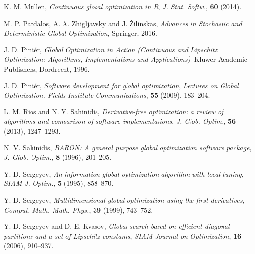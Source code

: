 \documentclass[runningheads]{llncs}
\begin{document}
\begin{thebibliography}{107}
\newblock K. M. Mullen,
\newblock \emph{\emph{Continuous global optimization in R}},
\newblock \emph{J. Stat. Softw.}, \textbf{60} (2014).

\newblock M. P. Pardalos, A. A. Zhigljavsky and J. \v Zilinskas,
\newblock \emph{Advances in Stochastic and Deterministic Global Optimization},
\newblock Springer, 2016.

\newblock J. D. Pint\'er,
\newblock \emph{Global Optimization in Action (Continuous and Lipschitz Optimization: Algorithms, Implementations and Applications)},
\newblock Kluwer Academic Publishers, Dordrecht, 1996.

\newblock J. D. Pint\'er,
\newblock \emph{\emph{Software development for global optimization}},
\newblock \emph{Lectures on Global Optimization. Fields Institute Communications}, \textbf{55} (2009), 183--204.

\newblock L. M. Rios and N. V. Sahinidis,
\newblock \emph{\emph{Derivative-free optimization: a review of algorithms and comparison of software implementations}},
\newblock \emph{J. Glob. Optim.}, \textbf{56} (2013), 1247--1293.

\newblock N. V. Sahinidis,
\newblock \emph{\emph{BARON: A general purpose global optimization software package}},
\newblock \emph{J. Glob. Optim.}, \textbf{8} (1996), 201--205.

\newblock Y. D. Sergeyev,
\newblock \emph{\emph{An information global optimization algorithm with local tuning}},
\newblock \emph{SIAM J. Optim.}, \textbf{5} (1995), 858--870.

\newblock Y. D. Sergeyev,
\newblock \emph{\emph{Multidimensional global optimization using the first derivatives}},
\newblock \emph{Comput. Math. Math. Phys.}, \textbf{39} (1999), 743--752.

\newblock Y. D. Sergeyev and D. E. Kvasov,
\newblock \emph{\emph{Global search based on efficient diagonal partitions and a set of Lipschitz constants}},
\newblock \emph{SIAM Journal on Optimization}, \textbf{16} (2006), 910--937.


\end{thebibliography}
\end{document}

